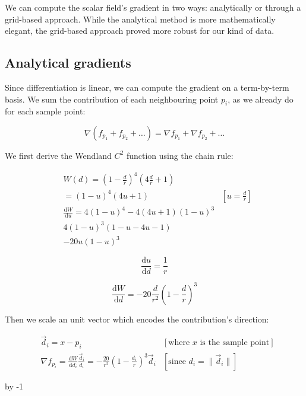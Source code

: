 \documentclass[a4paper]{report}
\begin{document}
We can compute the scalar field’s gradient in two ways: analytically or through a grid-based approach. While the analytical method is more mathematically elegant, the grid-based approach proved more robust for our kind of data.

\subsection{Analytical gradients}

Since differentiation is linear, we can compute the gradient on a term-by-term basis. We sum the contribution of each neighbouring point $p_i$, as we already do for each sample point:

$$
\nabla(f_{p_1}+f_{p_2}+\dots)
=\nabla f_{p_1}+\nabla f_{p_2}+\dots
$$

We first derive the Wendland $C^2$ function using the chain rule:

\begin{equation}
\begin{aligned}
& W(d)=\left(1-\frac dr\right)^4\left(4\frac dr+1\right)\\
& =(1-u)^4(4u+1) & \left[u=\frac dr\right]\\
& \frac{\mathrm{d}W}{\mathrm{d}u}=4(1-u)^4-4(4u+1)(1-u)^3\\
& 4(1-u)^3(1-u-4u-1)\\
& -20u(1-u)^3
\end{aligned}
\end{equation}

\begin{equation}
\frac{\mathrm{d}u}{\mathrm{d}d}=\frac 1r
\end{equation}

\begin{equation}
\frac{\mathrm{d}W}{\mathrm{d}d}=-20\frac d{r^2}\left(1-\frac dr\right)^3
\end{equation}

Then we scale an unit vector which encodes the contribution's direction:

\begin{align}
& \vec d_i=x-p_i & \left[\text{where $x$ is the sample point}\right]\\
& \nabla f_{p_i}=\frac{\mathrm{d}W}{\mathrm{d}d_i}\frac{\vec d_i}{d_i}=-\frac{20}{r^2}\left(1-\frac {d_i}r\right)^3\vec d_i & \left[\text{since }d_i=\|\vec d_i\|\right]
\end{align}

\advance\voffset by -1\baselineskip 
\enlargethispage{2\baselineskip}
\addtolength{\footskip}{1\baselineskip}
\end{document}
